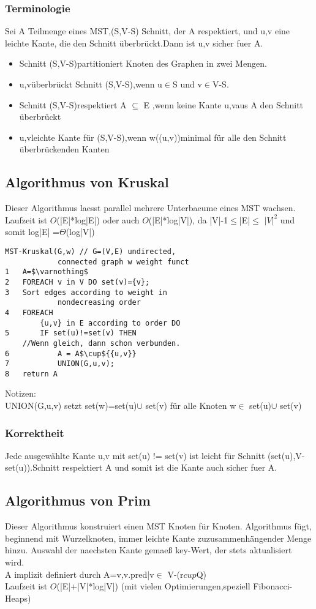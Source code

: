 \documentclass[jou,apacite]{apa6}
\begin{document}
\subsubsection{Terminologie}
Sei A Teilmenge eines MST,(S,V-S) Schnitt, der A respektiert, und {u,v} eine leichte Kante, die den Schnitt überbrückt.Dann ist {u,v} sicher fuer A.
\begin{itemize}
    \item Schnitt (S,V-S)partitioniert Knoten des Graphen in zwei Mengen. 
    \item {u,v}überbrückt Schnitt (S,V-S),wenn u$\in$S und v$\in$V-S. 
    \item Schnitt (S,V-S)respektiert A $\subseteq$ E ,wenn keine Kante {u,v}aus A den Schnitt überbrückt
    \item {u,v}leichte Kante für (S,V-S),wenn  w((u,v))minimal für alle den Schnitt überbrückenden Kanten
\end{itemize}

\subsection{Algorithmus von Kruskal}
Dieser Algorithmus laesst parallel mehrere Unterbaeume eines MST wachsen.\\
Laufzeit ist $O$(|E|*log|E|) oder auch $O$(|E|*log|V|), da |V|-1$\leq$|E|$\leq$ $|V|^{2}$ und somit log|E| =$\Theta$(log|V|)
\begin{lstlisting}[mathescape]
MST-Kruskal(G,w) // G=(V,E) undirected, 
            connected graph w weight funct
1   A=$\varnothing$
2   FOREACH v in V DO set(v)={v};
3   Sort edges according to weight in 
            nondecreasing order
4   FOREACH 
        {u,v} in E according to order DO
5       IF set(u)!=set(v) THEN 
    //Wenn gleich, dann schon verbunden.
6           A = A$\cup${{u,v}}
7           UNION(G,u,v);
8   return A
\end{lstlisting}
Notizen:\\
UNION(G,u,v) setzt set(w)=set(u)$\cup$ set(v) für alle Knoten  w$\in$ set(u)$\cup$ set(v)\\
\subsubsection{Korrektheit}
Jede ausgewählte Kante {u,v} mit set(u) != set(v) ist leicht für Schnitt (set(u),V-set(u)).Schnitt respektiert A und somit ist die Kante auch sicher fuer A.


\subsection{Algorithmus von Prim}
Dieser Algorithmus konstruiert einen MST Knoten für Knoten. Algorithmus fügt, beginnend mit Wurzelknoten, immer leichte Kante zuzusammenhängender Menge hinzu. Auswahl der naechsten Kante gemaeß key-Wert, der stets aktualisiert wird.\\
A implizit definiert durch A={{v,v.pred}|v$\in$ V-({r}$cup$Q)}\\
Laufzeit ist $O$(|E|+|V|*log|V|) (mit vielen Optimierungen,speziell Fibonacci-Heaps)
\end{document}
